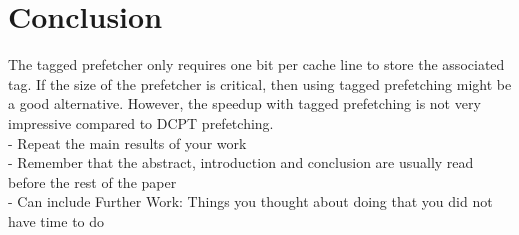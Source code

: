\section{Conclusion}
The tagged prefetcher only requires one bit per cache line to store the associated tag. If the size of the prefetcher is critical, then using tagged prefetching might be a good alternative. However, the speedup with tagged prefetching is not very impressive compared to DCPT prefetching.
\\
- Repeat the main results of your work\\
- Remember that the abstract, introduction and 
conclusion are usually read before the rest of the 
paper\\
- Can include Further Work: Things you thought about doing that you did not have time to do\\
